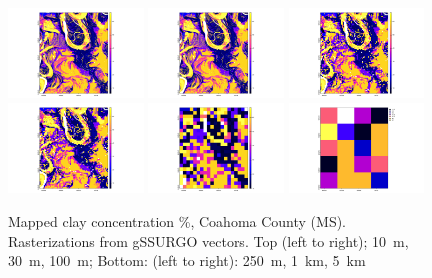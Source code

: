 \documentclass[soil, manuscript]{copernicus}
\begin{document}
\begin{figure}
 \includegraphics[width=0.32\textwidth]{ggsurgo-to-raster-10m.png}
  \hfill
  \includegraphics[width=0.32\textwidth]{ggsurgo-to-raster-30m.png}
  \hfill
  \includegraphics[width=0.32\textwidth]{ggsurgo-to-raster-100m.png}  
  \\
  \includegraphics[width=0.32\textwidth]{ggsurgo-to-raster-250m.png}
  \hfill
  \includegraphics[width=0.32\textwidth]{ggsurgo-to-raster-1km.png}
  \hfill
  \includegraphics[width=0.32\textwidth]{ggsurgo-to-raster-5km.png}
 \caption{Mapped clay concentration \%, Coahoma County (MS). Rasterizations from gSSURGO vectors. Top (left to right); 10~m, 30~m, 100~m; Bottom: (left to right): 250~m, 1~km, 5~km}
  \label{fig:coahoma_clay}
\end{figure}
\end{document}
